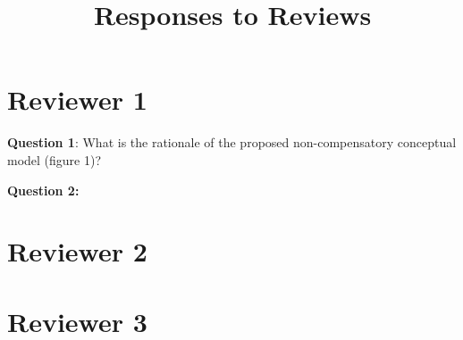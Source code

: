 \documentclass{article}
\title{Responses to Reviews}
\begin{document}
\section{Reviewer 1}

\textbf{Question 1}: What is the rationale of the proposed non-compensatory conceptual model (figure 1)?

\textbf{Question 2:}

\section{Reviewer 2}

\section{Reviewer 3}
\end{document}
